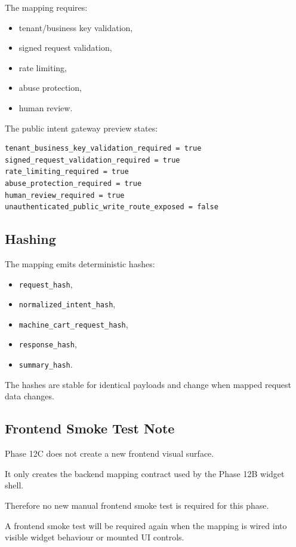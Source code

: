 The mapping requires:

\begin{itemize}
  \item tenant/business key validation,
  \item signed request validation,
  \item rate limiting,
  \item abuse protection,
  \item human review.
\end{itemize}

The public intent gateway preview states:

\begin{verbatim}
tenant_business_key_validation_required = true
signed_request_validation_required = true
rate_limiting_required = true
abuse_protection_required = true
human_review_required = true
unauthenticated_public_write_route_exposed = false
\end{verbatim}

\subsection{Hashing}

The mapping emits deterministic hashes:

\begin{itemize}
  \item \texttt{request\_hash},
  \item \texttt{normalized\_intent\_hash},
  \item \texttt{machine\_cart\_request\_hash},
  \item \texttt{response\_hash},
  \item \texttt{summary\_hash}.
\end{itemize}

The hashes are stable for identical payloads and change when mapped request data changes.

\subsection{Frontend Smoke Test Note}

Phase 12C does not create a new frontend visual surface.

It only creates the backend mapping contract used by the Phase 12B widget shell.

Therefore no new manual frontend smoke test is required for this phase.

A frontend smoke test will be required again when the mapping is wired into visible widget behaviour or mounted UI controls.

